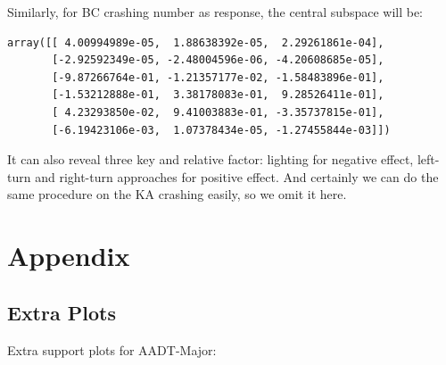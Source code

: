 \documentclass[11pt]{scrartcl} %
\begin{document}
\par

Similarly, for BC crashing number as response, the central subspace will be:

\begin{lstlisting}
array([[ 4.00994989e-05,  1.88638392e-05,  2.29261861e-04],
       [-2.92592349e-05, -2.48004596e-06, -4.20608685e-05],
       [-9.87266764e-01, -1.21357177e-02, -1.58483896e-01],
       [-1.53212888e-01,  3.38178083e-01,  9.28526411e-01],
       [ 4.23293850e-02,  9.41003883e-01, -3.35737815e-01],
       [-6.19423106e-03,  1.07378434e-05, -1.27455844e-03]])
\end{lstlisting}

It can also reveal three key and relative factor: lighting for negative effect, left-turn and right-turn approaches for positive effect. And certainly we can do the same procedure on the KA crashing easily, so we omit it here.

\section{Appendix}

\subsection{Extra Plots}

Extra support plots for AADT-Major:
\end{document}
